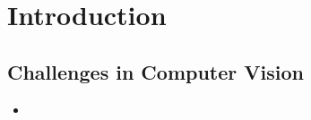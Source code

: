 \section{Introduction}
\subsection{Challenges in Computer Vision}
\begin{itemize}
	\item 
\end{itemize}